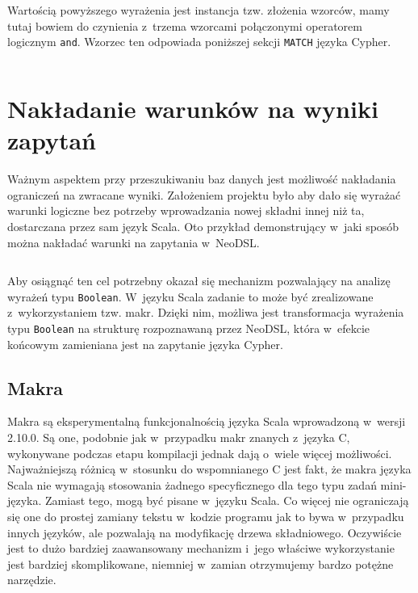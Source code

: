 \documentclass[brudnopis]{xmgr}
\begin{document}
\inputminted{scala}{listings/scala/dsl/patterns/functional-example-1.scala}

Wartością powyższego wyrażenia jest instancja tzw. złożenia wzorców, mamy tutaj bowiem do czynienia z~trzema wzorcami połączonymi operatorem logicznym \texttt{and}. Wzorzec ten odpowiada poniższej sekcji \texttt{MATCH} języka Cypher.

\inputminted{cypher}{listings/cypher/patterns-dsl-example.cypher}

\section{Nakładanie warunków na wyniki zapytań}

Ważnym aspektem przy przeszukiwaniu baz danych jest możliwość nakładania ograniczeń na zwracane wyniki. Założeniem projektu było aby dało się wyrażać warunki logiczne bez potrzeby wprowadzania nowej składni innej niż ta, dostarczana przez sam język Scala. Oto przykład demonstrujący w~jaki sposób można nakładać warunki na zapytania w~NeoDSL.

\inputminted{scala}{listings/scala/dsl/query-with-simple-condition.scala}

Aby osiągnąć ten cel potrzebny okazał się mechanizm pozwalający na analizę wyrażeń typu \texttt{Boolean}. W~języku Scala zadanie to może być zrealizowane z~wykorzystaniem tzw. makr. 
Dzięki nim, możliwa jest transformacja wyrażenia typu \texttt{Boolean} na strukturę rozpoznawaną przez NeoDSL, która w~efekcie końcowym zamieniana jest na zapytanie języka Cypher.

\subsection{Makra}

Makra są eksperymentalną funkcjonalnością języka Scala wprowadzoną w~wersji 2.10.0. Są one, podobnie jak w~przypadku makr znanych z~języka C, wykonywane podczas etapu kompilacji jednak dają o~wiele więcej możliwości. Najważniejszą różnicą w~stosunku do wspomnianego C jest fakt, że makra języka Scala nie wymagają stosowania żadnego specyficznego dla tego typu zadań mini-języka. Zamiast tego, mogą być pisane w~języku Scala. Co więcej nie ograniczają się one do prostej zamiany tekstu w~kodzie programu jak to bywa w~przypadku innych języków, ale pozwalają na modyfikację drzewa składniowego. Oczywiście jest to dużo bardziej zaawansowany mechanizm i~jego właściwe wykorzystanie jest bardziej skomplikowane, niemniej w~zamian otrzymujemy bardzo potężne narzędzie.
\end{document}
